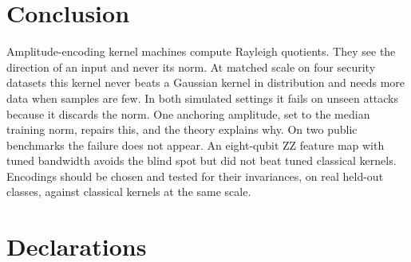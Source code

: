 \documentclass[pdflatex,sn-mathphys-num,lineno]{sn-jnl}
\theoremstyle{thmstyleone}
\begin{document}
\section{Conclusion}

Amplitude-encoding kernel machines compute Rayleigh quotients. They see the
direction of an input and never its norm. At matched scale on four security
datasets this kernel never beats a Gaussian kernel in distribution and needs more
data when samples are few. In both simulated settings it fails on unseen attacks
because it discards the norm. One anchoring amplitude, set to the median training
norm, repairs this, and the theory explains why. On two public benchmarks the
failure does not appear. An eight-qubit ZZ feature map with tuned bandwidth avoids
the blind spot but did not beat tuned classical kernels. Encodings should be chosen and tested for their
invariances, on real held-out classes, against classical kernels at the same scale.

\backmatter

\section*{Declarations}
\end{document}
